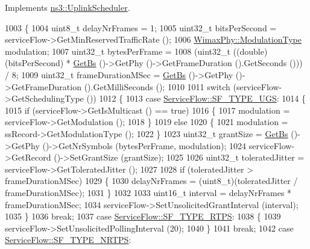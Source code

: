 Implements \hyperlink{classns3_1_1UplinkScheduler_a101bce0939ff2315db3d2e3b75b4fed6}{ns3\+::\+Uplink\+Scheduler}.


\begin{DoxyCode}
1003 \{
1004   uint8\_t delayNrFrames = 1;
1005   uint32\_t bitsPerSecond = serviceFlow->GetMinReservedTrafficRate ();
1006   \hyperlink{classns3_1_1WimaxPhy_a044c5d8a48ca992c39c2a946f6e755fa}{WimaxPhy::ModulationType} modulation;
1007   uint32\_t bytesPerFrame =
1008     (uint32\_t ((\textcolor{keywordtype}{double})(bitsPerSecond) * \hyperlink{classns3_1_1UplinkScheduler_afe61b7de71d92d2dff1b135744a6ff7e}{GetBs} ()->GetPhy ()->GetFrameDuration ().GetSeconds ())) / 8;
1009   uint32\_t frameDurationMSec = \hyperlink{classns3_1_1UplinkScheduler_afe61b7de71d92d2dff1b135744a6ff7e}{GetBs} ()->GetPhy ()->GetFrameDuration ().GetMilliSeconds ();
1010 
1011   \textcolor{keywordflow}{switch} (serviceFlow->GetSchedulingType ())
1012     \{
1013     \textcolor{keywordflow}{case} \hyperlink{classns3_1_1ServiceFlow_a7990ba10be1e098328fd1e6382a26235a969e0b62fa12fef1dbb23913744ed594}{ServiceFlow::SF\_TYPE\_UGS}:
1014       \{
1015         \textcolor{keywordflow}{if} (serviceFlow->GetIsMulticast () == \textcolor{keyword}{true})
1016           \{
1017             modulation = serviceFlow->GetModulation ();
1018           \}
1019         \textcolor{keywordflow}{else}
1020           \{
1021             modulation = ssRecord->GetModulationType ();
1022           \}
1023         uint32\_t grantSize = \hyperlink{classns3_1_1UplinkScheduler_afe61b7de71d92d2dff1b135744a6ff7e}{GetBs} ()->GetPhy ()->GetNrSymbols (bytesPerFrame, modulation);
1024         serviceFlow->GetRecord ()->SetGrantSize (grantSize);
1025 
1026         uint32\_t toleratedJitter = serviceFlow->GetToleratedJitter ();
1027 
1028         \textcolor{keywordflow}{if} (toleratedJitter > frameDurationMSec)
1029           \{
1030             delayNrFrames = (uint8\_t)(toleratedJitter / frameDurationMSec);
1031           \}
1032 
1033         uint16\_t interval = delayNrFrames * frameDurationMSec;
1034         serviceFlow->SetUnsolicitedGrantInterval (interval);
1035       \}
1036       \textcolor{keywordflow}{break};
1037     \textcolor{keywordflow}{case} \hyperlink{classns3_1_1ServiceFlow_a7990ba10be1e098328fd1e6382a26235a0e98ff713b932a029acad7e5b24bbf55}{ServiceFlow::SF\_TYPE\_RTPS}:
1038       \{
1039         serviceFlow->SetUnsolicitedPollingInterval (20);
1040       \}
1041       \textcolor{keywordflow}{break};
1042     \textcolor{keywordflow}{case} \hyperlink{classns3_1_1ServiceFlow_a7990ba10be1e098328fd1e6382a26235a7f8577f851a9f01d159442a3a3fcdf48}{ServiceFlow::SF\_TYPE\_NRTPS}:

\end{DoxyCode}
